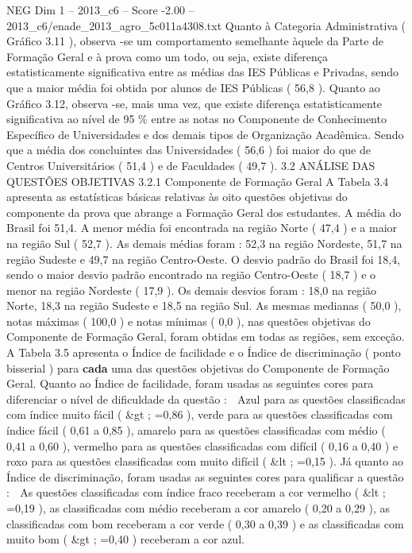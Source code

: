 \begin{textsample}{NEG Dim 1 – 2013\_c6 – Score -2.00 – 2013\_c6/enade\_2013\_agro\_5c011a4308.txt}
Quanto à Categoria Administrativa ( Gráfico 3.11 ), observa -se um comportamento semelhante àquele da Parte de Formação Geral e à prova como um todo, ou seja, existe diferença estatisticamente significativa entre as médias das IES Públicas e Privadas, sendo que a maior média foi obtida por alunos de IES Públicas ( 56,8 ).
Quanto ao Gráfico 3.12, observa -se, mais uma vez, que existe diferença estatisticamente significativa ao nível de 95 \% entre as notas no Componente de Conhecimento Específico de Universidades e dos demais tipos de Organização Acadêmica.
Sendo que a média dos concluintes das Universidades ( 56,6 ) foi maior do que de Centros Universitários ( 51,4 ) e de Faculdades ( 49,7 ). 3.2 ANÁLISE DAS QUESTÕES OBJETIVAS 3.2.1 Componente de Formação Geral A Tabela 3.4 apresenta as estatísticas básicas relativas às oito questões objetivas do componente da prova que abrange a Formação Geral dos estudantes.
A média do Brasil foi 51,4.
A menor média foi encontrada na região Norte ( 47,4 ) e a maior na região Sul ( 52,7 ).
As demais médias foram : 52,3 na região Nordeste, 51,7 na região Sudeste e 49,7 na região Centro-Oeste.
O desvio padrão do Brasil foi 18,4, sendo o maior desvio padrão encontrado na região Centro-Oeste ( 18,7 ) e o menor na região Nordeste ( 17,9 ).
Os demais desvios foram : 18,0 na região Norte, 18,3 na região Sudeste e 18,5 na região Sul.
As mesmas medianas ( 50,0 ), notas máximas ( 100,0 ) e notas mínimas ( 0,0 ), nas questões objetivas do Componente de Formação Geral, foram obtidas em todas as regiões, sem exceção.
A Tabela 3.5 apresenta o Índice de facilidade e o Índice de discriminação ( ponto bisserial ) para \textbf{cada} uma das questões objetivas do Componente de Formação Geral.
Quanto ao Índice de facilidade, foram usadas as seguintes cores para diferenciar o nível de dificuldade da questão :  Azul para as questões classificadas com índice muito fácil ( \&gt ; =0,86 ), verde para as questões classificadas com índice fácil ( 0,61 a 0,85 ), amarelo para as questões classificadas com médio ( 0,41 a 0,60 ), vermelho para as questões classificadas com difícil ( 0,16 a 0,40 ) e roxo para as questões classificadas com muito difícil ( \&lt ; =0,15 ).
Já quanto ao Índice de discriminação, foram usadas as seguintes cores para qualificar a questão :  As questões classificadas com índice fraco receberam a cor vermelho ( \&lt ; =0,19 ), as classificadas com médio receberam a cor amarelo ( 0,20 a 0,29 ), as classificadas com bom receberam a cor verde ( 0,30 a 0,39 ) e as classificadas com muito bom ( \&gt ; =0,40 ) receberam a cor azul.

\end{textsample}
